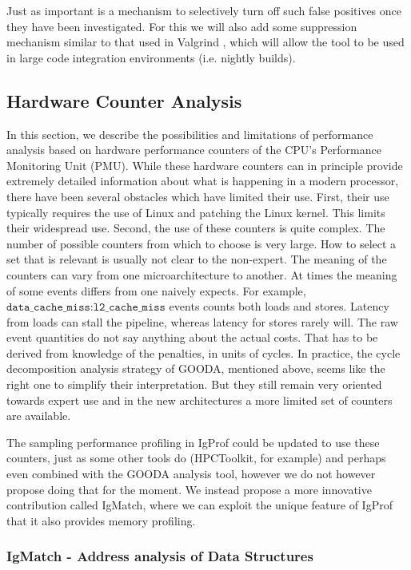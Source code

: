 \documentclass[notitlepage,letter,12pt]{article}
\begin{document}
Just as important is a mechanism to selectively turn off such false 
positives once they have been investigated.
For this we will also add some suppression mechanism similar to that
used in Valgrind \cite{VALGRINDSUPP}, which will allow the tool to be
used in large code integration environments (i.e. nightly builds).

\subsection{Hardware Counter Analysis}

In this section, we describe the possibilities and limitations of 
performance analysis based on hardware performance counters of the 
CPU's Performance Monitoring Unit (PMU). While these hardware counters 
can in principle provide extremely detailed information about what 
is happening in a modern processor, there have been several obstacles which
have limited their use. First, their use typically requires the use of Linux 
and patching the Linux kernel. This limits their widespread use.
Second, the use of these counters is quite complex. The number of
possible counters from which to choose is very large. How to select
a set that is relevant is usually not clear to the non-expert. The
meaning of the counters can vary from one microarchitecture to
another. At times the meaning of some events differs from one naively
expects. For example, $\texttt{data\_cache\_miss:l2\_cache\_miss}$
events counts both loads and stores. Latency from loads can stall
the pipeline, whereas latency for stores rarely will. The raw event
quantities do not say anything about the actual costs. That has to
be derived from knowledge of the penalties, in units of cycles.
In practice, the cycle decomposition analysis strategy of GOODA, mentioned
above, seems like the right one to simplify their interpretation. But
they still remain very oriented towards expert use and in the new
architectures a more limited set of counters are available.

The sampling performance profiling in IgProf could be updated to use 
these counters, just as some other tools do (HPCToolkit, for example) 
and perhaps even combined with the GOODA analysis tool, however
we do not however propose doing that for the moment. We instead propose
a more innovative contribution called IgMatch, where we can exploit
the unique feature of IgProf that it also provides memory profiling.

\subsubsection{IgMatch - Address analysis of Data Structures}
\end{document}
